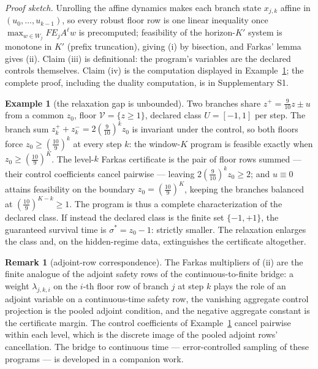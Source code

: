 \documentclass[10pt,twocolumn]{article}
\theoremstyle{definition}
\newtheorem{remark}{Remark}
\newtheorem{example}{Example}
\begin{document}
\emph{Proof sketch.} Unrolling the affine dynamics makes each branch state
\(x_{j,k}\) affine in \((u_{0},\dots,u_{k-1})\), so every robust floor row is one linear
inequality once \(\max_{w \in W_{j}} F E_{j} A^{\ell} w\) is precomputed; feasibility of the
horizon-\(K'\) system is monotone in \(K'\) (prefix truncation), giving (i) by bisection, and
Farkas' lemma gives (ii). Claim (iii) is definitional: the program's variables are the declared
controls themselves. Claim (iv) is the computation displayed in
Example~\ref{ex:relax-gap}; the complete proof, including the duality computation, is in
Supplementary S1.

\begin{example}[the relaxation gap is unbounded]\label{ex:relax-gap}
Two branches share \(z^{+} = \tfrac{9}{10} z \pm u\) from a common \(z_{0}\), floor
\(\mathcal{V} = \{z \ge 1\}\), declared class \(U = [-1,1]\) per step. The branch sum
\(z^{+}_{k} + z^{-}_{k} = 2 (\tfrac{9}{10})^{k} z_{0}\) is invariant under the control, so both
floors force \(z_{0} \ge (\tfrac{10}{9})^{k}\) at every step \(k\): the window-\(K\) program is
feasible exactly when \(z_{0} \ge (\tfrac{10}{9})^{K}\). The level-\(k\) Farkas certificate is
the pair of floor rows summed --- their control coefficients cancel pairwise --- leaving
\(2(\tfrac{9}{10})^{k} z_{0} \ge 2\); and \(u \equiv 0\) attains feasibility on the boundary
\(z_{0} = (\tfrac{10}{9})^{K}\), keeping the branches balanced at
\((\tfrac{10}{9})^{K-k} \ge 1\). The program is thus a complete characterization of the declared
class. If instead the declared class is the finite set \(\{-1, +1\}\), the guaranteed survival
time is \(\sigma^{*} = z_{0} - 1\): strictly smaller. The relaxation enlarges the class and, on
the hidden-regime data, extinguishes the certificate altogether.
\end{example}

\begin{remark}[adjoint-row correspondence]\label{rem:adjoint-duality}
The Farkas multipliers of (ii) are the finite analogue of the adjoint safety rows of the
continuous-to-finite bridge: a weight \(\lambda_{j,k,i}\) on the \(i\)-th floor row of branch
\(j\) at step \(k\) plays the role of an adjoint variable on a continuous-time safety row, the
vanishing aggregate control projection is the pooled adjoint condition, and the negative
aggregate constant is the certificate margin. The control coefficients of
Example~\ref{ex:relax-gap} cancel pairwise within each level, which is the discrete image of
the pooled adjoint rows' cancellation. The bridge to continuous time --- error-controlled
sampling of these programs --- is developed in a companion work.
\end{remark}
\end{document}

